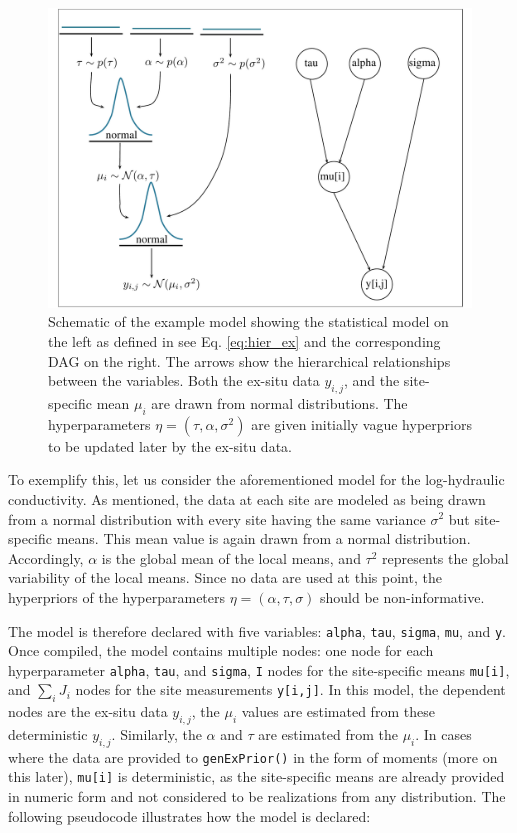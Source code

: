 \begin{figure}[ht]
    \centering
    \includegraphics[width=1.0\textwidth]{img/hierarchical_example.pdf}
    \caption{Schematic of the example model showing the statistical model on the left as defined in see Eq. \ref{eq:hier_ex} and the corresponding DAG on the right. The arrows show the hierarchical relationships between the variables. Both the ex-situ data $y_{i,j}$, and the site-specific mean $\mu_i$ are drawn from normal distributions. The hyperparameters $\eta = (\tau, \alpha, \sigma^2)$ are given initially vague hyperpriors to be updated later by the ex-situ data.}
    \label{fig:model_workflow}
\end{figure}

To exemplify this, let us consider the aforementioned model for the log-hydraulic conductivity. 
As mentioned, the data at each site are modeled as being drawn from a normal distribution with every site having the same variance $\sigma^2$ but site-specific means. 
This mean value is again drawn from a normal distribution. 
Accordingly, $\alpha$ is the global mean of the local means, and $\tau^2$ represents the global variability of the local means. 
Since no data are used at this point, the hyperpriors of the hyperparameters $\eta = (\alpha, \tau, \sigma)$ should be non-informative.

The model is therefore declared with five variables: \texttt{alpha}, \texttt{tau}, \texttt{sigma}, \texttt{mu}, and \texttt{y}. 
Once compiled, the model contains multiple nodes: one node for each hyperparameter \texttt{alpha}, \texttt{tau}, and \texttt{sigma}, \texttt{I} nodes for the site-specific means \texttt{mu[i]}, and \texttt{$\sum_i{J_i}$} nodes for the site measurements \texttt{y[i,j]}. 
In this model, the dependent nodes are the ex-situ data $y_{i,j}$, the $\mu_i$ values are estimated from these deterministic $y_{i,j}$. 
Similarly, the $\alpha$ and $\tau$ are estimated from the $\mu_i$. 
In cases where the data are provided to \texttt{genExPrior()} in the form of moments (more on this later), \texttt{mu[i]} is deterministic, as the site-specific means are already provided in numeric form and not considered to be realizations from any distribution. 
The following pseudocode illustrates how the model is declared:

